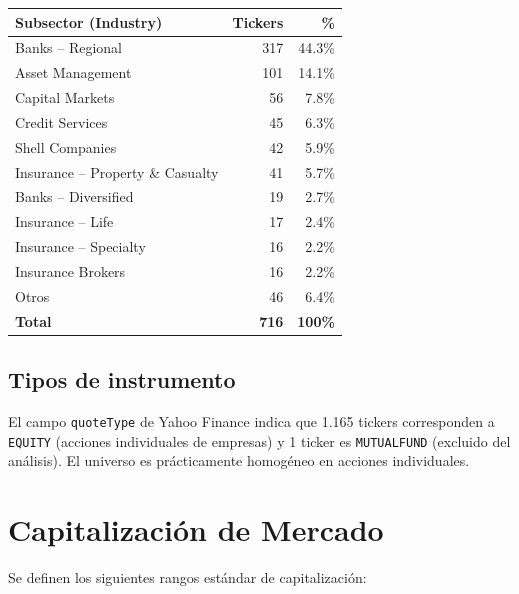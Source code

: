 \begin{center}
\begin{tabular}{lrr}
  \toprule
  \textbf{Subsector (Industry)} & \textbf{Tickers} & \textbf{\%} \\
  \midrule
  Banks -- Regional                  & 317 & 44.3\% \\
  Asset Management                   & 101 & 14.1\% \\
  Capital Markets                    &  56 &  7.8\% \\
  Credit Services                    &  45 &  6.3\% \\
  Shell Companies                    &  42 &  5.9\% \\
  Insurance -- Property \& Casualty  &  41 &  5.7\% \\
  Banks -- Diversified               &  19 &  2.7\% \\
  Insurance -- Life                  &  17 &  2.4\% \\
  Insurance -- Specialty             &  16 &  2.2\% \\
  Insurance Brokers                  &  16 &  2.2\% \\
  Otros                              &  46 &  6.4\% \\
  \midrule
  \textbf{Total}                     & \textbf{716} & \textbf{100\%} \\
  \bottomrule
\end{tabular}
\end{center}

\subsection*{Tipos de instrumento}

El campo \texttt{quoteType} de Yahoo Finance indica que 1.165 tickers
corresponden a \texttt{EQUITY} (acciones individuales de empresas) y
1 ticker es \texttt{MUTUALFUND} (excluido del análisis). El universo
es prácticamente homogéneo en acciones individuales.

\section*{Capitalización de Mercado}

Se definen los siguientes rangos estándar de capitalización:

